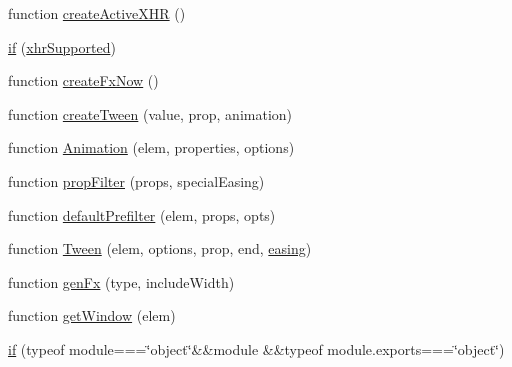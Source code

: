 \begin{DoxyCompactItemize}
function \hyperlink{_scripts_2jquery-1_810_82_8js_a54bf63f1b5f905292db45a1d6a9dc300}{create\+Active\+X\+H\+R} ()
\item 
\hyperlink{_scripts_2jquery-1_810_82_8js_ae2dd433d7bb020adf83db5351a0671e1}{if} (\hyperlink{_scripts_2jquery-1_810_82_8js_afd7e72f2f357a5a8b17e46776a6283eb}{xhr\+Supported})
\item 
function \hyperlink{_scripts_2jquery-1_810_82_8js_a3c7bcef859b0811abb1dbf890c6cc635}{create\+Fx\+Now} ()
\item 
function \hyperlink{_scripts_2jquery-1_810_82_8js_a0c2043fcd2fa684768877127fbbc2e55}{create\+Tween} (value, prop, animation)
\item 
function \hyperlink{_scripts_2jquery-1_810_82_8js_aa33f7dcb8ee41587d545a0bc69849296}{Animation} (elem, properties, options)
\item 
function \hyperlink{_scripts_2jquery-1_810_82_8js_a0196d1f08ae60b747901b5a2950f72f1}{prop\+Filter} (props, special\+Easing)
\item 
function \hyperlink{_scripts_2jquery-1_810_82_8js_a8041b1040535dcee84ad474aaaf11dde}{default\+Prefilter} (elem, props, opts)
\item 
function \hyperlink{_scripts_2jquery-1_810_82_8js_adcb517ce3709049d37bb5f5bd3811edf}{Tween} (elem, options, prop, end, \hyperlink{_scripts_2jquery-1_810_82_8js_a9758a312629fa6de1744280dd6e6253b}{easing})
\item 
function \hyperlink{_scripts_2jquery-1_810_82_8js_a0dad9ae6c57fd32a071de202faa87081}{gen\+Fx} (type, include\+Width)
\item 
function \hyperlink{_scripts_2jquery-1_810_82_8js_ab8e6e1fb3b8b51b6afe437c63df0e09f}{get\+Window} (elem)
\item 
\hyperlink{_scripts_2jquery-1_810_82_8js_aa2cebb51f03a2e3ab2af45a3f9241c96}{if} (typeof module===\char`\"{}object\char`\"{}\&\&module \&\&typeof module.\+exports===\char`\"{}object\char`\"{})
\end{DoxyCompactItemize}
